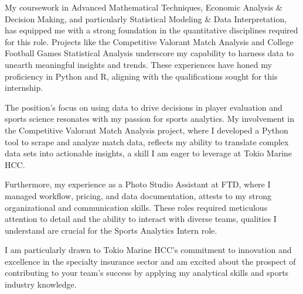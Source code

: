 
My coursework in Advanced Mathematical Techniques, Economic Analysis \& Decision Making, and particularly Statistical Modeling \& Data Interpretation, has equipped me with a strong foundation in the quantitative disciplines required for this role. Projects like the Competitive Valorant Match Analysis and College Football Games Statistical Analysis underscore my capability to harness data to unearth meaningful insights and trends. These experiences have honed my proficiency in Python and R, aligning with the qualifications sought for this internship.

The position's focus on using data to drive decisions in player evaluation and sports science resonates with my passion for sports analytics. My involvement in the Competitive Valorant Match Analysis project, where I developed a Python tool to scrape and analyze match data, reflects my ability to translate complex data sets into actionable insights, a skill I am eager to leverage at Tokio Marine HCC.

Furthermore, my experience as a Photo Studio Assistant at FTD, where I managed workflow, pricing, and data documentation, attests to my strong organizational and communication skills. These roles required meticulous attention to detail and the ability to interact with diverse teams, qualities I understand are crucial for the Sports Analytics Intern role.

I am particularly drawn to Tokio Marine HCC's commitment to innovation and excellence in the specialty insurance sector and am excited about the prospect of contributing to your team's success by applying my analytical skills and sports industry knowledge.
